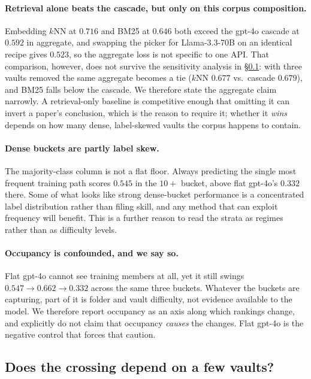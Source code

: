 \documentclass[11pt]{article}
\begin{document}
\paragraph{Retrieval alone beats the cascade, but only on this corpus composition.}
Embedding $k$NN at $0.716$ and BM25 at $0.646$ both exceed the gpt-4o cascade at $0.592$ in aggregate, and swapping the picker for Llama-3.3-70B on an identical recipe gives $0.523$, so the aggregate loss is not specific to one API.
That comparison, however, does not survive the sensitivity analysis in \S\ref{sec:sensitivity}: with three vaults removed the same aggregate becomes a tie ($k$NN $0.677$ vs.\ cascade $0.679$), and BM25 falls below the cascade.
We therefore state the aggregate claim narrowly.
A retrieval-only baseline is competitive enough that omitting it can invert a paper's conclusion, which is the reason to require it; whether it \emph{wins} depends on how many dense, label-skewed vaults the corpus happens to contain.

\paragraph{Dense buckets are partly label skew.}
The majority-class column is not a flat floor.
Always predicting the single most frequent training path scores $0.545$ in the $10{+}$ bucket, above flat gpt-4o's $0.332$ there.
Some of what looks like strong dense-bucket performance is a concentrated label distribution rather than filing skill, and any method that can exploit frequency will benefit.
This is a further reason to read the strata as regimes rather than as difficulty levels.

\paragraph{Occupancy is confounded, and we say so.}
Flat gpt-4o cannot see training members at all, yet it still swings $0.547 \rightarrow 0.662 \rightarrow 0.332$ across the same three buckets.
Whatever the buckets are capturing, part of it is folder and vault difficulty, not evidence available to the model.
We therefore report occupancy as an axis along which rankings change, and explicitly do not claim that occupancy \emph{causes} the changes.
Flat gpt-4o is the negative control that forces that caution.

\subsection{Does the crossing depend on a few vaults?}
\label{sec:sensitivity}
\end{document}
